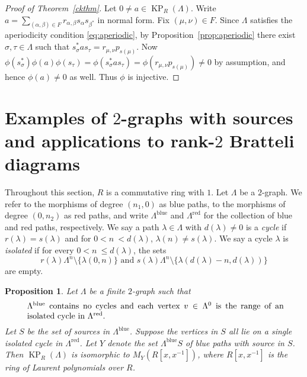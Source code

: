 \documentclass[a4paper,12pt]{amsart}
\numberwithin{equation}{section}
\newtheorem{prop}[thm]{Proposition}
\theoremstyle{definition}
\theoremstyle{remark}
\begin{document}
\begin{proof}[Proof of Theorem~\ref{ckthm}]  Let $0\neq a \in \operatorname{KP}_R(\Lambda)$.  Write
$a = \sum_{(\alpha, \beta) \in F} r_{\alpha, \beta}s_\alpha s_{\beta^{*}}$  in normal form.
Fix $(\mu,\nu)\in F$. Since $\Lambda$ satisfies the aperiodicity condition \eqref{eq:aperiodic}, 
by Proposition~\ref{prop:aperiodic} 
there exist $\sigma, \tau \in \Lambda$ such that 
$s_\sigma^*as_\tau = r_{\mu, \nu}p_{s(\mu)}$. Now
$\phi(s_\sigma^*)\phi(a)\phi(s_\tau)=\phi(s_\sigma^*as_\tau)=\phi(r_{\mu, \nu}p_{s(\mu)}) \neq 0$ by assumption, and hence  $\phi(a) \neq 0$  as well.  Thus $\phi$ is injective.
\end{proof}

\section{Examples of $2$-graphs with sources\\ and applications to rank-$2$ Bratteli diagrams}\label{sec-Bratteli}

Throughout this section, $R$ is a commutative ring with $1$.
Let  $\Lambda$ be a $2$-graph.  We refer to the morphisms of degree $(n_1,0)$ as blue paths, 
to the morphisms of degree $(0,n_2)$ as red paths, and  write $\Lambda^{{\operatorname{\mathrm{blue}}}}$ and $\Lambda^{{\operatorname{\mathrm{red}}}}$ for the collection of blue and red paths, respectively.  
We say a path $\lambda \in \Lambda$ with $d(\lambda)\neq 0$ is a \emph{cycle} if
$r(\lambda)=s(\lambda)$ and for $0 <n\ < d(\lambda)$,  $\lambda(n) \neq s(\lambda)$.  
We say a cycle $\lambda$ is \emph{isolated}
if for every $0 < n\ \leq d(\lambda)$,  the sets 
\[
 r(\lambda)\Lambda^n \setminus \{\lambda(0,n)\} \text{ and }  s(\lambda)\Lambda^n \setminus \{\lambda(d(\lambda)-n,d(\lambda))\}
\]
are empty.

\begin{prop}\label{prop3.5}
Let $\Lambda$ be a finite $2$-graph such that
\begin{equation}\label{3.1}
\ \hfill
\parbox{0.9\textwidth}{
$\Lambda^{{\operatorname{\mathrm{blue}}}}$ contains no cycles and each vertex $v \in \Lambda^0$
is the range of an isolated cycle in $\Lambda^{{\operatorname{\mathrm{red}}}}$.
}\end{equation}
Let $S$ be the set of sources in $\Lambda^{{\operatorname{\mathrm{blue}}}}$. Suppose the vertices in $S$ all lie on a single isolated cycle in $\Lambda^{{\operatorname{\mathrm{red}}}}$. Let $Y$ denote the set $\Lambda^{{\operatorname{\mathrm{blue}}}} S$ of blue paths with source in $S$.  
Then $\operatorname{KP}_R(\Lambda)$ is isomorphic to $M_Y(R[x,x^{-1}])$, where $R[x,x^{-1}]$ is the ring of Laurent polynomials over $R$.
\end{prop}
\end{document}
